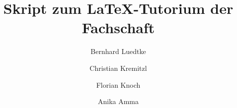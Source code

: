 % 

\title{Skript zum \LaTeX-Tutorium der Fachschaft }
\author{Bernhard Luedtke \and Christian Kremitzl \and Florian Knoch \and Anika Amma}




\thispagestyle{empty}
\newpage

\setcounter{page}{1} %
\tableofcontents
\newpage






















